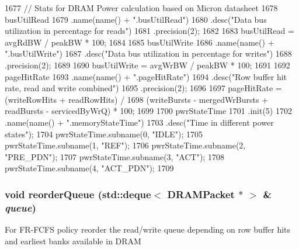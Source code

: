 \begin{DoxyCode}
{1677     // Stats for DRAM Power calculation based on Micron datasheet
1678     busUtilRead
1679         .name(name() + ".busUtilRead")
1680         .desc("Data bus utilization in percentage for reads")
1681         .precision(2);
1682 
1683     busUtilRead = avgRdBW / peakBW * 100;
1684 
1685     busUtilWrite
1686         .name(name() + ".busUtilWrite")
1687         .desc("Data bus utilization in percentage for writes")
1688         .precision(2);
1689 
1690     busUtilWrite = avgWrBW / peakBW * 100;
1691 
1692     pageHitRate
1693         .name(name() + ".pageHitRate")
1694         .desc("Row buffer hit rate, read and write combined")
1695         .precision(2);
1696 
1697     pageHitRate = (writeRowHits + readRowHits) /
1698         (writeBursts - mergedWrBursts + readBursts - servicedByWrQ) * 100;
1699 
1700     pwrStateTime
1701         .init(5)
1702         .name(name() + ".memoryStateTime")
1703         .desc("Time in different power states");
1704     pwrStateTime.subname(0, "IDLE");
1705     pwrStateTime.subname(1, "REF");
1706     pwrStateTime.subname(2, "PRE_PDN");
1707     pwrStateTime.subname(3, "ACT");
1708     pwrStateTime.subname(4, "ACT_PDN");
1709 }
\end{DoxyCode}
\hypertarget{classDRAMCtrl_aabfe6aa48e67d5b5c21e77dfa8a7e965}{
\subsubsection[{reorderQueue}]{\setlength{\rightskip}{0pt plus 5cm}void reorderQueue ({\bf std::deque}$<$ {\bf DRAMPacket} $\ast$ $>$ \& {\em queue})}}
\label{classDRAMCtrl_aabfe6aa48e67d5b5c21e77dfa8a7e965}
For FR-\/FCFS policy reorder the read/write queue depending on row buffer hits and earliest banks available in DRAM 


